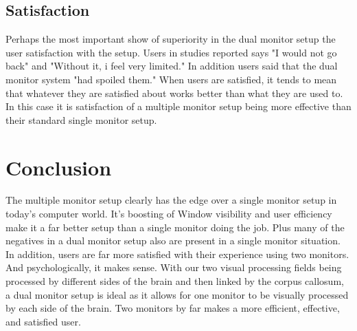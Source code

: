 \documentclass[a4paper]{article}
\begin{document}
\subsection{Satisfaction}
Perhaps the most important show of superiority in the dual monitor setup the user satisfaction with the setup. Users in studies reported says "I would not go back" and "Without it, i feel very limited."\cite{Grudin} In addition users said that the dual monitor system "had spoiled them."\cite{Grudin} When users are satisfied, it tends to mean that whatever they are satisfied about works better than what they are used to. In this case it is satisfaction of a multiple monitor setup being more effective than their standard single monitor setup.

\section{Conclusion}
The multiple monitor setup clearly has the edge over a single monitor setup in today's computer world. It's boosting of Window visibility and user efficiency make it a far better setup than a single monitor doing the job. Plus many of the negatives in a dual monitor setup also are present in a single monitor situation. In addition, users are far more satisfied with their experience using two monitors. And psychologically, it makes sense. With our two visual processing fields being processed by different sides of the brain and then linked by the corpus callosum, a dual monitor setup is ideal as it allows for one monitor to be visually processed by each side of the brain. Two monitors by far makes a more efficient, effective, and satisfied user.



\end{document}
